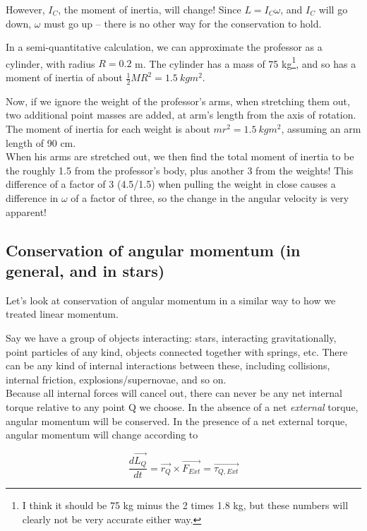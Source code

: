 \documentclass[8.01x]{subfiles}
\begin{document}
However, $I_C$, the moment of inertia, will change! Since $L = I_C \omega$, and $I_C$ will go down, $\omega$ must go up -- there is no other way for the conservation to hold.

In a semi-quantitative calculation, we can approximate the professor as a cylinder, with radius $R = 0.2$ m. The cylinder has a mass of 75 kg\footnote{I think it should be 75 kg minus the 2 times 1.8 kg, but these numbers will clearly not be very accurate either way.}, and so has a moment of inertia of about $\frac{1}{2} M R^2 = \SI{1.5}{kg m^2}$.

Now, if we ignore the weight of the professor's arms, when stretching them out, two additional point masses are added, at arm's length from the axis of rotation. The moment of inertia for each weight is about $m r^2 = \SI{1.5}{kg m^2}$, assuming an arm length of 90 cm.\\
When his arms are stretched out, we then find the total moment of inertia to be the roughly 1.5 from the professor's body, plus another 3 from the weights! This difference of a factor of 3 (4.5/1.5) when pulling the weight in close causes a difference in $\omega$ of a factor of three, so the change in the angular velocity is very apparent!

\subsection{Conservation of angular momentum (in general, and in stars)}

Let's look at conservation of angular momentum in a similar way to how we treated linear momentum.

Say we have a group of objects interacting: stars, interacting gravitationally, point particles of any kind, objects connected together with springs, etc. There can be any kind of internal interactions between these, including collisions, internal friction, explosions/supernovae, and so on.\\
Because all internal forces will cancel out, there can never be any net internal torque relative to any point Q we choose. In the absence of a net \emph{external} torque, angular momentum will be conserved. In the presence of a net external torque, angular momentum will change according to

\begin{equation}
\frac{d\vec{L_Q}}{dt} = \vec{r_Q} \times \vec{F_{Ext}} = \vec{\tau_{Q,Ext}}
\end{equation}
\end{document}
